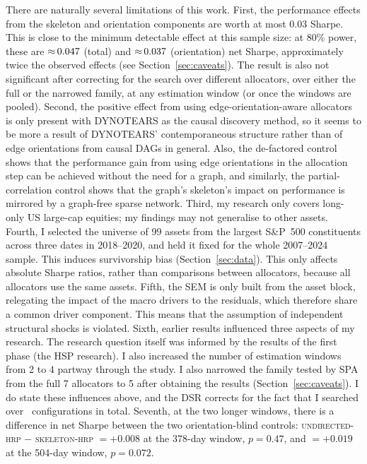 \documentclass[11pt, a4paper]{report}
\newcommand{\skelhrp}{\textsc{skeleton-hrp}}
\newcommand{\undirhrp}{\textsc{undirected-hrp}}
\begin{document}
There are naturally several limitations of this work.
First, the performance effects from the skeleton and orientation components are worth at most $0.03$ Sharpe. 
This is close to the minimum detectable effect at this sample size: at 80\% power, these are ${\approx}\,0.047$ (total) and ${\approx}\,0.037$ (orientation) net Sharpe, approximately twice the observed effects (see Section~\ref{sec:caveats}).
The result is also not significant after correcting for the search over different allocators, over either the full or the narrowed family, at any estimation window (or once the windows are pooled).
Second, the positive effect from using edge-orientation-aware allocators is only present with DYNOTEARS as the causal discovery method, so it seems to be more a result of DYNOTEARS' contemporaneous structure rather than of edge orientations from causal DAGs in general.
Also, the de-factored control shows that the performance gain from using edge orientations in the allocation step can be achieved without the need for a graph, and similarly, the partial-correlation control shows that the graph's skeleton's impact on performance is mirrored by a graph-free sparse network.
Third, my research only covers long-only US large-cap equities; my findings may not generalise to other assets.
Fourth, I selected the universe of 99 assets from the largest S\&P~500
constituents across three dates in 2018--2020, and held it fixed for the whole
2007--2024 sample. This induces survivorship bias (Section~\ref{sec:data}). This only affects absolute Sharpe ratios, rather than comparisons between allocators, because all allocators use the same assets.
Fifth, the SEM is only built from the asset block, relegating the impact of the macro drivers to the residuals, which therefore share a common driver component. This means that the assumption of independent structural shocks is violated.
Sixth, earlier results influenced three aspects of my research. The research
question itself was informed by the results of the first phase (the
HSP research). I also increased the number of estimation windows from 2 to 4 partway through the study. I also narrowed the family tested by SPA from the full 7 allocators to 5 after obtaining the results (Section~\ref{sec:caveats}). I do state these influences above, and the DSR corrects for the fact that I searched over \rsNtrials\ configurations in total. 
Seventh, at the two longer windows, there is a difference in net Sharpe between the two orientation-blind controls: \undirhrp{} $-$ \skelhrp{} $= +0.008$ at the 378-day window, $p=0.47$, and $= +0.019$ at the 504-day window, $p=0.072$. 
\end{document}

